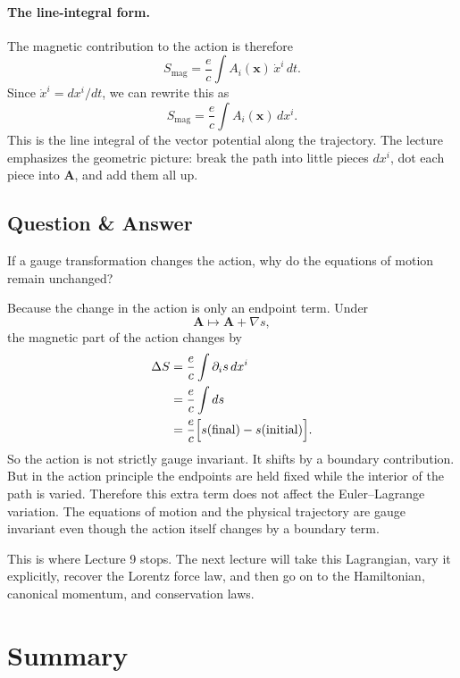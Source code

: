\paragraph{The line-integral form.}
The magnetic contribution to the action is therefore
\begin{equation}
S_{\mathrm{mag}}=\frac{e}{c}\int A_i(\mathbf x)\,\dot x^i\,dt.
\end{equation}
Since \(\dot x^i=dx^i/dt\), we can rewrite this as
\begin{equation}
S_{\mathrm{mag}}=\frac{e}{c}\int A_i(\mathbf x)\,dx^i.
\end{equation}
This is the line integral of the vector potential along the trajectory. The lecture emphasizes the geometric picture: break the path into little pieces \(dx^i\), dot each piece into \(\mathbf A\), and add them all up.

\subsection{Question \& Answer}

If a gauge transformation changes the action, why do the equations of motion remain unchanged?

Because the change in the action is only an endpoint term. Under
\[
\mathbf A\mapsto \mathbf A+\nabla s,
\]
the magnetic part of the action changes by
\begin{align}
\Delta S
&=\frac{e}{c}\int \partial_i s\,dx^i\\
&=\frac{e}{c}\int ds\\
&=\frac{e}{c}\Bigl[s(\mathrm{final})-s(\mathrm{initial})\Bigr].
\end{align}
So the action is not strictly gauge invariant. It shifts by a boundary contribution. But in the action principle the endpoints are held fixed while the interior of the path is varied. Therefore this extra term does not affect the Euler--Lagrange variation. The equations of motion and the physical trajectory are gauge invariant even though the action itself changes by a boundary term.

This is where Lecture 9 stops. The next lecture will take this Lagrangian, vary it explicitly, recover the Lorentz force law, and then go on to the Hamiltonian, canonical momentum, and conservation laws.

\section{Summary}


